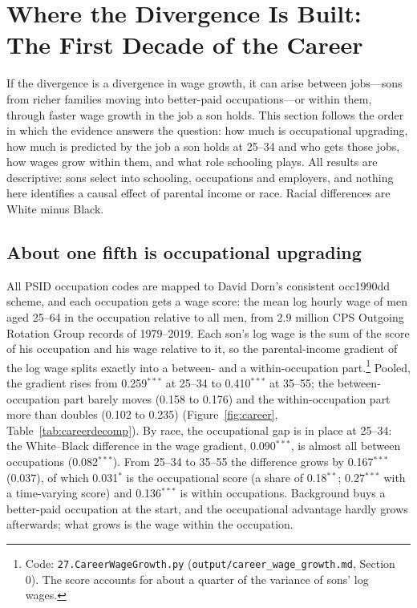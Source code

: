 \section{Where the Divergence Is Built: The First Decade of the Career}\label{sec:careers}

If the divergence is a divergence in wage growth, it can arise between jobs---sons from richer families moving into
better-paid occupations---or within them, through faster wage growth in the job a son holds. This section follows the
order in which the evidence answers the question: how much is occupational upgrading, how much is predicted by the job
a son holds at 25--34 and who gets those jobs, how wages grow within them, and what role schooling plays. All results are
descriptive: sons select into schooling, occupations and employers, and nothing here identifies a causal effect of
parental income or race. Racial differences are White minus Black.

\subsection{About one fifth is occupational upgrading}

All PSID occupation codes are mapped to David Dorn's consistent occ1990dd scheme, and each occupation gets a wage score:
the mean log hourly wage of men aged 25--64 in the occupation relative to all men, from 2.9 million CPS Outgoing
Rotation Group records of 1979--2019. Each son's log wage is the sum of the score of his occupation and his wage
relative to it, so the parental-income gradient of the log wage splits exactly into a between- and a
within-occupation part.\footnote{Code: \texttt{27.CareerWageGrowth.py} (\texttt{output/career\_wage\_growth.md},
Section 0). The score accounts for about a quarter of the variance of sons' log wages.} Pooled, the gradient rises
from 0.259$^{***}$ at 25--34 to 0.410$^{***}$ at 35--55; the between-occupation part barely moves (0.158 to 0.176) and
the within-occupation part more than doubles (0.102 to 0.235) (Figure~\ref{fig:career}, Table~\ref{tab:careerdecomp}).
By race, the occupational gap is in place at 25--34: the White--Black difference in the wage gradient, 0.090$^{***}$, is
almost all between occupations (0.082$^{***}$). From 25--34 to 35--55 the difference grows by 0.167$^{***}$ (0.037), of
which 0.031$^{*}$ is the occupational score (a share of 0.18$^{**}$; 0.27$^{***}$ with a time-varying score) and
0.136$^{***}$ is within occupations. Background buys a better-paid occupation at the start, and the occupational
advantage hardly grows afterwards; what grows is the wage within the occupation.

